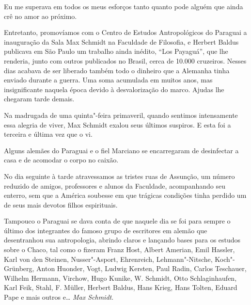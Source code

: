Eu me superava em todos os meus esforços tanto quanto pode alguém que
ainda crê no amor ao próximo.

Entretanto, promovíamos com o Centro de Estudos Antropológicos do
Paraguai a inauguração da Sala Max Schmidt na Faculdade de Filosofia, e
Herbert Baldus publicava em São Paulo um trabalho ainda inédito, ``Los
Payaguá'', que lhe renderia, junto com outros publicados no Brasil,
cerca de 10.000 cruzeiros. Nesses dias acabava de ser liberado também
todo o dinheiro que a Alemanha tinha enviado durante a guerra. Uma soma
acumulada em muitos anos, mas insignificante naquela época devido à
desvalorização do marco. Ajudas lhe chegaram tarde demais.

Na madrugada de uma quinta"-feira primaveril, quando sentimos
intensamente essa alegria de viver, Max Schmidt exalou seus últimos
suspiros. E esta foi a terceira e última vez que o vi.

Alguns alemães do Paraguai e o fiel Marciano se encarregaram de
desinfectar a casa e de acomodar o corpo no caixão.

No dia seguinte à tarde atravessamos as tristes ruas de Assunção, um
número reduzido de amigos, professores e alunos da Faculdade,
acompanhando seu enterro, sem que a América soubesse em que trágicas
condições tinha perdido um de seus mais devotos filhos espirituais.

Tampouco o Paraguai se dava conta de que naquele dia se foi para sempre
o último dos integrantes do famoso grupo de escritores em alemão que
desentranhou sua antropologia, abrindo claros e lançando bases para os
estudos sobre o Chaco, tal como o fizeram Franz Host, Albert Amerian,
Emil Hassler, Karl von den Steinen, Nusser"-Asport, Ehrenreich,
Lehmann"-Nitsche, Koch"-Grünberg, Anton Huonder, Vogt, Ludwig Kersten,
Paul Radin, Carlos Teschauer, Wilhelm Hermann, Virchow, Hugo Kunike, W.
Schmidt, Otto Schlaginhaufen, Karl Feik, Stahl, F. Müller, Herbert
Baldus, Hans Krieg, Hans Tolten, Eduard Pape e mais outros e\ldots{} \textit{Max
Schmidt}.

\pagebreak
\thispagestyle{empty}

